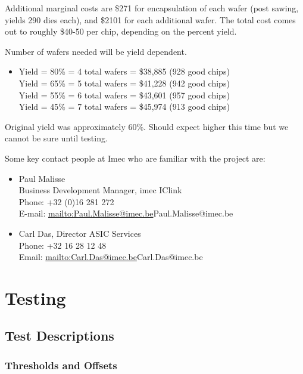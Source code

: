 \documentclass[letterpaper]{article}
\begin{document}
Additional marginal costs are \$271 for encapsulation of each wafer (post sawing, yields 290 dies each), and \$2101 for each additional wafer. The total cost comes out to roughly \$40-50 per chip, depending on the percent yield.

Number of wafers needed will be yield dependent.

\begin{itemize}
    \item Yield = 80\% = 4 total wafers = \$38,885  (928 good chips) \\
          Yield = 65\% = 5 total wafers = \$41,228  (942 good chips) \\
          Yield = 55\% = 6 total wafers = \$43,601  (957 good chips) \\
          Yield = 45\% = 7 total wafers = \$45,974  (913 good chips)
\end{itemize}


Original yield was approximately 60\%. Should expect higher this time but we cannot be sure until testing.

Some key contact people at Imec who are familiar with the project are:

\begin{itemize}
\item Paul Malisse \\
Business Development Manager, imec IClink \\
Phone: +32 (0)16 281 272 \\
E-mail: \url{mailto:Paul.Malisse@imec.be}{Paul.Malisse@imec.be}

\item Carl Das, Director ASIC Services \\
Phone: +32 16 28 12 48 \\
Email: \url{mailto:Carl.Das@imec.be}{Carl.Das@imec.be}
\end{itemize}



\section{Testing}

\subsection{Test Descriptions}

\subsubsection{Thresholds and Offsets}
\end{document}
